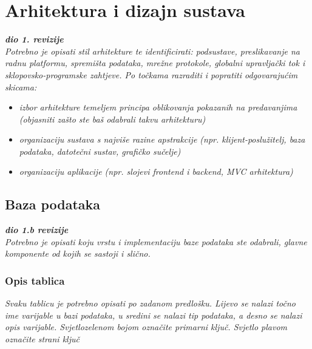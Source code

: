 \chapter{Arhitektura i dizajn sustava}
		
		\textbf{\textit{dio 1. revizije}}\\

		\textit{ Potrebno je opisati stil arhitekture te identificirati: podsustave, preslikavanje na radnu platformu, spremišta podataka, mrežne protokole, globalni upravljački tok i sklopovsko-programske zahtjeve. Po točkama razraditi i popratiti odgovarajućim skicama:}
	\begin{itemize}
		\item 	\textit{izbor arhitekture temeljem principa oblikovanja pokazanih na predavanjima (objasniti zašto ste baš odabrali takvu arhitekturu)}
		\item 	\textit{organizaciju sustava s najviše razine apstrakcije (npr. klijent-poslužitelj, baza podataka, datotečni sustav, grafičko sučelje)}
		\item 	\textit{organizaciju aplikacije (npr. slojevi frontend i backend, MVC arhitektura) }		
	\end{itemize}

	
		

		

				
		\section{Baza podataka}
			
			\textbf{\textit{dio 1.b revizije}}\\
			
		\textit{Potrebno je opisati koju vrstu i implementaciju baze podataka ste odabrali, glavne komponente od kojih se sastoji i slično.}
		
			\subsection{Opis tablica}
			

				\textit{Svaku tablicu je potrebno opisati po zadanom predlošku. Lijevo se nalazi točno ime varijable u bazi podataka, u sredini se nalazi tip podataka, a desno se nalazi opis varijable. Svjetlozelenom bojom označite primarni ključ. Svjetlo plavom označite strani ključ}
				

